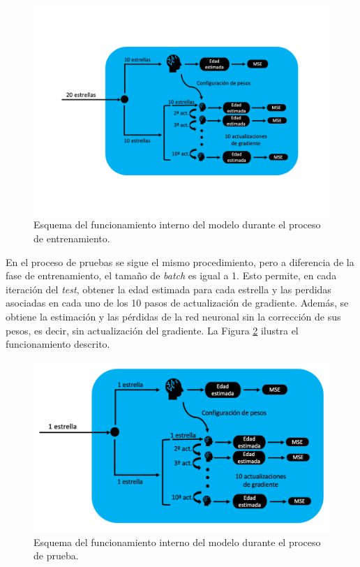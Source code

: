 \begin{figure}[H]
\begin{center}
 \includegraphics[width=0.8\linewidth]{Figuras/MAML/maml_core_train.pdf}
\end{center}
\caption{Esquema del funcionamiento interno del modelo durante el proceso de entrenamiento.}
 \label{fig:core_maml_train}
\end{figure}

En el proceso de pruebas se sigue el mismo procedimiento, pero a diferencia de la fase de entrenamiento, el tamaño de \emph{batch} es igual a 1. Esto permite, en cada iteración del \emph{test}, obtener la edad estimada para cada estrella y las perdidas asociadas en cada uno de los 10 pasos de actualización de gradiente. Además, se obtiene la estimación y las pérdidas de la red neuronal sin la corrección de sus pesos, es decir, sin actualización del gradiente. La Figura \ref{fig:core_maml_test} ilustra el funcionamiento descrito.

\begin{figure}[H]
\begin{center}
 \includegraphics[width=0.8\linewidth]{Figuras/MAML/maml_core_test.pdf}
\end{center}
\caption{Esquema del funcionamiento interno del modelo durante el proceso de prueba.}
 \label{fig:core_maml_test}
\end{figure}


